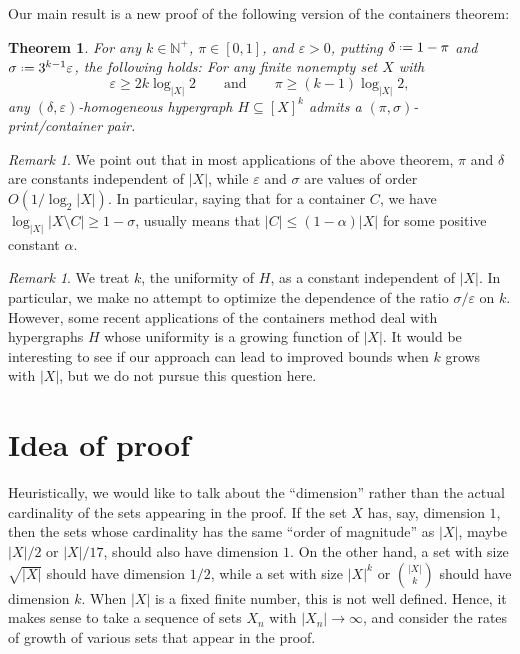 \documentclass[12pt,reqno]{amsart}
\theoremstyle{plain}
\newtheorem{theorem}[equation]{Theorem}
\theoremstyle{definition}
\theoremstyle{remark}
\newtheorem{remark}[equation]{Remark}
\newcommand{\0}{\mathbb{\emptyset}}
\newcommand{\N}{\mathbb{N}}
\newcommand*{\defeq}{\mathrel{\vcenter{\baselineskip0.5ex \lineskiplimit0pt \hbox{\scriptsize.}\hbox{\scriptsize.}}}=}
\newcommand{\de}{\delta}
\newcommand{\e}{\varepsilon}
\newcommand{\si}{\sigma}
\newcommand{\logX}{\log_{|X|}}
\begin{document}
Our main result is a new proof of the following version of the containers theorem:

\begin{theorem}\label{containers_theorem:finite}
	For any $k \in \N^+$, $\pi \in [0,1]$, and $\e > 0$, putting $\de \defeq 1 - \pi$ and $\si \defeq 3^{k-1} \e$, the following holds: For any finite nonempty set $X$ with \[ \e \geq 2k\logX 2 \qquad \text{and} \qquad \pi \geq (k-1)\logX 2,\] any $(\de, \e)$-homogeneous hypergraph $H \subseteq [X]^k$ admits a $(\pi,\si)$-print/container pair.
\end{theorem}


\begin{remark}\label{remark:dependency_on_k}
	We point out that in most applications of the above theorem, $\pi$ and $\de$ are constants independent of $|X|$, while $\e$ and $\si$ are values of order $O(1/\log_2{|X|})$. In particular, saying that for a container $C$, we have $\log_{|X|}|X \setminus C| \geq 1 - \si$, usually means that $|C| \leq (1-\alpha)|X|$ for some positive constant $\alpha$.
\end{remark}

\begin{remark}
	We treat $k$, the uniformity of $H$, as a constant independent of $|X|$. In particular, we make no attempt to optimize the dependence of the ratio $\si/\e$ on $k$. However, some recent applications of the containers method deal with hypergraphs $H$ whose uniformity is a growing function of $|X|$. It would be interesting to see if our approach can lead to improved bounds when $k$ grows with $|X|$, but we do not pursue this question here.
\end{remark}

\section{Idea of proof}\label{sec:proofidea}

\noindent Heuristically, we would like to talk about the ``dimension'' rather than the actual cardinality of the sets appearing in the proof. If the set $X$ has, say, dimension $1$, then the sets whose cardinality has the same ``order of magnitude'' as $|X|$, maybe $|X|/2$ or $|X|/17$, should also have dimension $1$. On the other hand, a set with size $\sqrt{|X|}$ should have dimension $1/2$, while a set with size $|X|^k$ or ${|X| \choose k}$ should have dimension $k$. When $|X|$ is a fixed finite number, this is not well defined. Hence, it makes sense to take a sequence of sets $X_n$ with $|X_n|\rightarrow\infty$, and consider the rates of growth of various sets that appear in the proof. 
\end{document}
